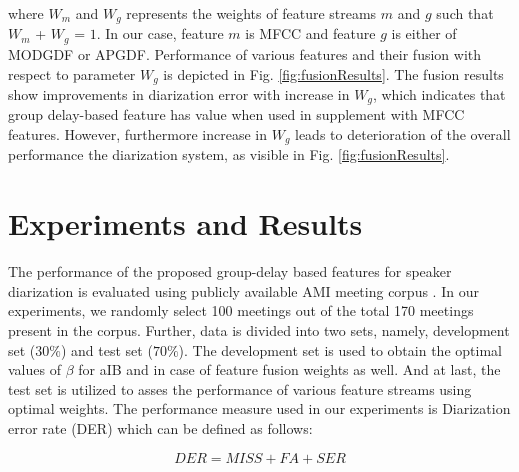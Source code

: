 \documentclass[conference]{IEEEtran}
\begin{document}
where $W_{m}$ and $W_{g}$ represents the weights of feature streams $m$ and $g$ 
such that $W_{m}$ + $W_{g}$ = $1$. In our case, feature $m$ is MFCC and feature 
$g$ is either of MODGDF or APGDF. Performance of various features and their fusion 
with respect to parameter $W_g$ is depicted in Fig. \ref{fig:fusionResults}. The fusion results 
show improvements in diarization error with increase in $W_g$, which indicates that group delay-based 
feature has value when used in supplement with MFCC features. However, furthermore increase in $W_g$ leads to deterioration of the overall performance the diarization system, as visible in Fig. \ref{fig:fusionResults}.   



\section{Experiments and Results }
\label{experimentsNresults}

The performance of the proposed group-delay based features for
speaker diarization is evaluated using publicly available AMI meeting corpus \cite{AMIData}. In
our experiments, we randomly select 100 meetings out of the total 170 meetings present in
the corpus. Further, data is divided into two sets, namely, development set ($30\%$) and test set ($70\%$).
The development set is used to obtain the optimal values of $\beta$ for aIB and in case of
feature fusion weights as well. And at last, the test set is utilized to asses the performance of various feature streams using optimal weights. The performance measure used in our experiments is Diarization error rate (DER) which can be defined as follows: 

\begin{equation}
DER = MISS + FA + SER
\end{equation}

\end{document}
